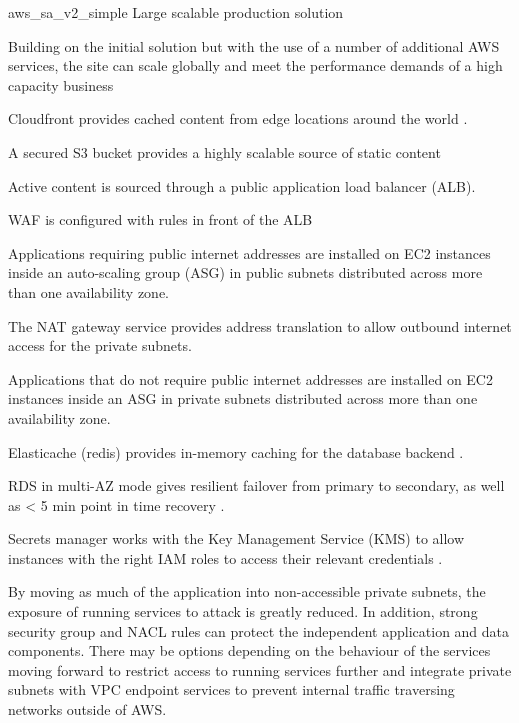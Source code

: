 
\architecture
{aws_sa_v2_simple}
{Large scalable production solution}

\changes
{Building on the initial solution but with the use of a number of additional AWS services, the site can scale globally and meet the performance demands of a high capacity business}
{
\item \label{item:aws_sa_v2_simple_cloudfront} Cloudfront provides cached content from edge locations around the world \cite{cfn-api}. 
\item \label{item:aws_sa_v2_simple_s3_origin} A secured S3 bucket provides a highly scalable source of static content
\item \label{item:aws_sa_v2_simple_alb} Active content is sourced through a public application load balancer (ALB).
\item \label{item:aws_sa_v2_simple_waf} WAF is configured with rules in front of the ALB \cite{ AWS-shield, waf-apiref, waf-dg}
\item \label{item:aws_sa_v2_simple_azs} Applications requiring public internet addresses are installed on EC2 instances inside an auto-scaling group (ASG) in public subnets distributed across more than one availability zone.
\item \label{item:aws_sa_v2_simple_nat} The NAT gateway service provides address translation to allow outbound internet access for the private subnets.
\item \label{item:aws_sa_v2_simple_private} Applications that do not require public internet addresses are installed on EC2 instances inside an ASG in private subnets distributed across more than one availability zone.
\item \label{item:aws_sa_v2_simple_elasticache} Elasticache (redis) provides in-memory caching for the database backend \cite{redis-ug}.
\item \label{item:aws_sa_v2_simple_rds} RDS in multi-AZ mode gives resilient failover from primary to secondary, as well as < 5 min point in time recovery \cite{rds-api}.
\item \label{item:aws_sa_v2_simple_secrets} Secrets manager works with the Key Management Service (KMS) to allow instances with the right IAM roles to access their relevant credentials \cite{secretsmanager-userguide}.
}




By moving as much of the application into non-accessible private subnets, the exposure of running services to attack is greatly reduced. In addition, strong security group and NACL rules can protect the independent application and data components. There may be options depending on the behaviour of the services moving forward to restrict access to running services further and integrate private subnets with VPC endpoint services to prevent internal traffic traversing networks outside of AWS.

